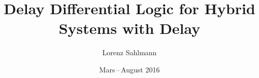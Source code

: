 \documentclass[
    final,
    fontsize=10pt,
    oneside,
    abstract=on,
    toc=bibliographynumbered
]{scrreprt}
\newcommand*{\cdepartment}{}%
\newcommand*{\department}[1]{\gdef\cdepartment{#1}}
\newcommand*{\cinstitution}{}%
\newcommand*{\institution}[1]{\gdef\cinstitution{#1}}
\newcommand*{\csupervisor}{}%
\newcommand*{\supervisor}[1]{\gdef\csupervisor{#1}}
\newcommand*{\csupervisorinst}{}%
\newcommand*{\supervisorinst}[1]{\gdef\csupervisorinst{#1}}
\newcommand*{\cscndsupervisor}{}%
\newcommand*{\scndsupervisor}[1]{\gdef\cscndsupervisor{#1}}
\newcommand*{\cscndsupervisorinst}{}%
\newcommand*{\scndsupervisorinst}[1]{\gdef\cscndsupervisorinst{#1}}
\renewcommand{\maketitle}{}
\begin{document}
\department{Master Comasic}
\institution{École Polytechnique}
\subject{Stage de Recherche\\ at\\ Carnegie Mellon University}
\title{Delay Differential Logic for Hybrid Systems with Delay}
\author{Lorenz Sahlmann}
\date{Mars\,--\,August 2016}
\supervisor{Prof.~Dr.~André Platzer}
\supervisorinst{Carnegie Mellon University}
\scndsupervisor{Eric Goubault}
\scndsupervisorinst{École Polytechnique}


%

%

%

%

%

%



%


\nocite{Fulton16LogicProofs,*}

%
\end{document}
